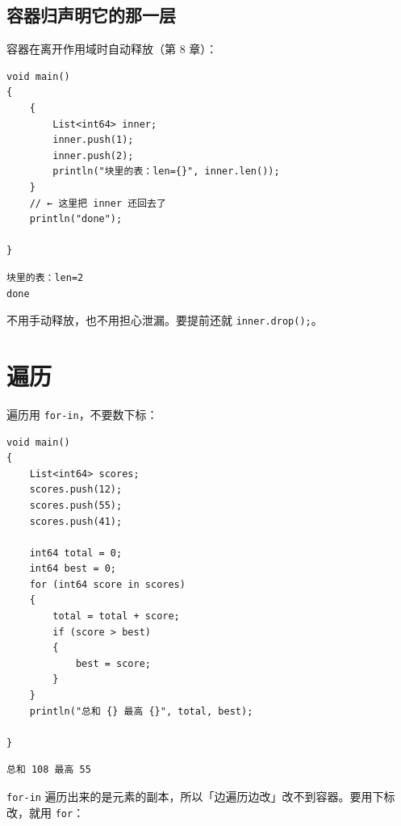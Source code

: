 \subsection*{容器归声明它的那一层}

容器在离开作用域时自动释放（第 8 章）：

\par
\medskip
\begin{lstlisting}[style=chali]
void main()
{
    {
        List<int64> inner;
        inner.push(1);
        inner.push(2);
        println("块里的表：len={}", inner.len());
    }
    // ← 这里把 inner 还回去了
    println("done");

}
\end{lstlisting}
\par
\medskip

\par
\medskip
\begin{lstlisting}[style=out]
块里的表：len=2
done
\end{lstlisting}
\par
\medskip

不用手动释放，也不用担心泄漏。要提前还就 \texttt{inner.\allowbreak{}drop(\allowbreak{})\allowbreak{};}。

\section{遍历}

遍历用 \texttt{for-in}，不要数下标：

\par
\medskip
\begin{lstlisting}[style=chali]
void main()
{
    List<int64> scores;
    scores.push(12);
    scores.push(55);
    scores.push(41);

    int64 total = 0;
    int64 best = 0;
    for (int64 score in scores)
    {
        total = total + score;
        if (score > best)
        {
            best = score;
        }
    }
    println("总和 {} 最高 {}", total, best);

}
\end{lstlisting}
\par
\medskip

\par
\medskip
\begin{lstlisting}[style=out]
总和 108 最高 55
\end{lstlisting}
\par
\medskip

\texttt{for-in} 遍历出来的是元素的副本，所以「边遍历边改」改不到容器。要用下标改，就用 \texttt{for}：

